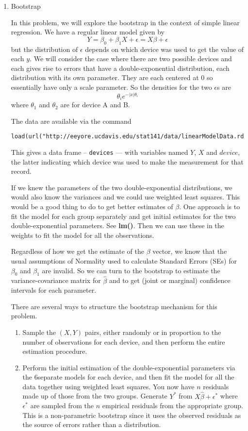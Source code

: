 \documentclass[11pt]{article}
\def\SFunction#1{\textbf{#1()}}
\begin{document}
\begin{enumerate}
\item Bootstrap

In this problem, we will explore the bootstrap in the context of
simple linear regression.
We have a regular linear model given by 
$$
 Y = \beta_0 + \beta_1X + \epsilon = X\beta + \epsilon
$$ 
but the distribution of $\epsilon$ depends on which device was
 used to get the value of each $y$.  We will consider the case where
 there are two possible devices and each gives rise to errors that
 have a double-exponential distribution, each distribution with its
 own parameter.  They are each centered at $0$ so essentially have
 only a scale parameter.
So the densities for the two $\epsilon$s are
$$ \theta_i e^{-\vert x\vert \theta_i}$$ where $\theta_1$ and
$\theta_2$ are for device A and B.

The data are available via the command
\begin{verbatim}
load(url("http://eeyore.ucdavis.edu/stat141/data/linearModelData.rda"))
\end{verbatim}
This gives a data frame -- \texttt{devices} --- with variables named
$Y$, $X$ and $device$, the latter indicating which device was used to
make the measurement for that record.


If we knew the parameters of the two double-exponential distributions,
we would also know the variances and we could use weighted least
squares.  This would be a good thing to do to get better estimates of
$\beta$.  One approach is to fit the model for each group separately
and get initial estimates for the two double-exponential parameters.
See \SFunction{lm}.  Then we can use these in the weights to fit the
model for all the observations.

Regardless of how we get the estimate of the $\beta$ vector, we know
that the usual assumptions of Normality used to calculate Standard
Errors (SEs) for $\beta_0$ and $\beta_1$ are invalid. So we can turn
to the bootstrap to estimate the variance-covariance matrix for
$\hat\beta$ and to get (joint or marginal) confidence intervals for
each parameter.


There are several ways to structure the bootstrap mechanism
for this problem.
\begin{enumerate}
\item Sample the $(X, Y)$ pairs, either randomly or in proportion to
  the number of observations for each device, and then perform the entire
  estimation procedure.

\item Perform the initial estimation of the double-exponential
  parameters via the 6separate models for each device, and then fit the
  model for all the data together using weighted least squares.  You
  now have $n$ residuals made up of those from the two groups.
  Generate $Y^*$ from $X\hat{\beta} + \epsilon^*$ where $\epsilon^*$
  are sampled from the $n$ empirical residuals from the
  appropriate group.
  This is a non-parametric bootstrap since it uses the 
  observed residuals as the source of errors
  rather than a distribution.
  


\end{enumerate}
\end{enumerate}
\end{document}
